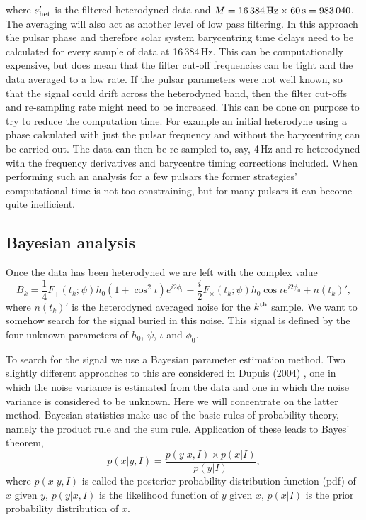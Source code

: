 where $s'_{\rm{het}}$ is the filtered heterodyned data and $M=16\,384\,{\rm Hz}\times60\,{\rm s} =
983\,040$. The averaging will also act as another level of low pass filtering. In this approach the
pulsar phase and therefore solar system barycentring time delays need to be calculated for every
sample of data at 16\,384\,Hz. This can be computationally expensive, but does mean that the filter
cut-off frequencies can be tight and the data averaged to a low rate. If the pulsar parameters were
not well known, so that the signal could drift across the heterodyned band, then the filter cut-offs
and re-sampling rate might need to be increased. This can be done on purpose to try to reduce the
computation time. For example an initial heterodyne using a phase calculated with just the pulsar
frequency and without the barycentring can be carried out. The data can then be re-sampled to, say,
4\,Hz and re-heterodyned with the frequency derivatives and barycentre timing corrections included.
When performing such an analysis for a few pulsars the former strategies' computational time is not
too constraining, but for many pulsars it can become quite inefficient. 

\subsection{Bayesian analysis}
Once the data has been heterodyned we are left with the complex value
\begin{equation}\label{Bofk}
B_k = \frac{1}{4}F_+(t_k;\psi)h_0(1+\cos^2\iota)e^{i2\phi_0} -
\frac{i}{2}F_{\times}(t_k;\psi)h_0\cos{\iota}e^{i2\phi_0}+n(t_k)',
\end{equation}
where $n(t_k)'$ is the heterodyned averaged noise for the $k^{\rm{th}}$ sample. We want to
somehow search for the signal buried in this noise. This signal is defined by the four unknown
parameters of $h_0$, $\psi$, $\iota$ and $\phi_0$.

To search for the signal we use a Bayesian parameter estimation method. Two slightly different
approaches to this are considered in Dupuis (2004) \cite{Dupuis:2004}, one in which the noise
variance is estimated from the data and one in which the noise variance is considered to be unknown.
Here we will concentrate on the latter method. Bayesian statistics make use of the basic rules of
probability theory, namely the product rule and the sum rule. Application of these leads to Bayes'
theorem,
\begin{equation}\label{Bayes}
p(x|y,I) = \frac{p(y|x,I)\times{}p(x|I)}{p(y|I)},
\end{equation}
where $p(x|y,I)$ is called the posterior probability distribution function (pdf) of $x$ given $y$,
$p(y|x,I)$ is the likelihood function of $y$ given $x$, $p(x|I)$ is the prior probability
distribution of $x$.

